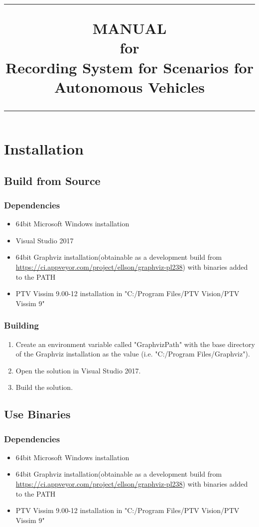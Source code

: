 \documentclass[a4paper, 11pt]{scrreprt}
\title{%
\flushright
\rule{16cm}{5pt}\vskip1cm
\Huge{MANUAL}\\
\vspace{2cm}
for\\
\vspace{2cm}
Recording System for Scenarios for Autonomous Vehicles\\
\vfill
\rule{16cm}{5pt}
}
\date{}
\begin{document}
	\maketitle
	
	\chapter{Installation}
	\section{Build from Source}
	\subsection{Dependencies}
	\begin{itemize}
		\item 64bit Microsoft Windows installation
		\item Visual Studio 2017 
		\item 64bit Graphviz installation(obtainable as a development build from \url{https://ci.appveyor.com/project/ellson/graphviz-pl238}) with binaries added to the PATH
		\item PTV Vissim 9.00-12 installation in "C:/Program Files/PTV Vision/PTV Vissim 9"
	\end{itemize}
	\subsection{Building}
	\begin{enumerate}
		\item Create an environment variable called "GraphvizPath" with the base directory of the Graphviz installation as the value (i.e. "C:/Program Files/Graphviz").
		\item Open the solution in Visual Studio 2017.
		\item Build the solution.
	\end{enumerate}
	
	\section{Use Binaries}
	\subsection{Dependencies}
	\begin{itemize}
		\item 64bit Microsoft Windows installation
		\item 64bit Graphviz installation(obtainable as a development build from \url{https://ci.appveyor.com/project/ellson/graphviz-pl238}) with binaries added to the PATH
		\item PTV Vissim 9.00-12 installation in "C:/Program Files/PTV Vision/PTV Vissim 9"
	\end{itemize}
\end{document}

